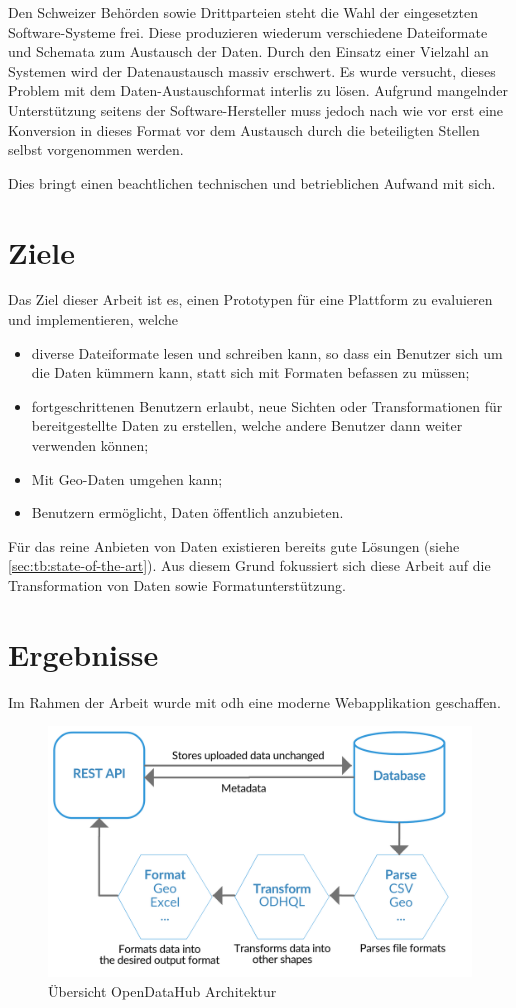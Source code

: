 Den Schweizer Behörden sowie Drittparteien steht die Wahl der eingesetzten Software-Systeme frei. Diese produzieren wiederum verschiedene Dateiformate und Schemata zum Austausch der Daten. Durch den Einsatz einer Vielzahl an Systemen wird der Datenaustausch massiv erschwert. Es wurde versucht, dieses Problem mit dem Daten-Austauschformat \gls{interlis} zu lösen. Aufgrund mangelnder Unterstützung seitens der Software-Hersteller muss jedoch nach wie vor erst eine Konversion in dieses Format vor dem Austausch durch die beteiligten Stellen selbst vorgenommen werden.

Dies bringt einen beachtlichen technischen und betrieblichen Aufwand mit sich.

\section*{Ziele}
Das Ziel dieser Arbeit ist es, einen Prototypen für eine Plattform zu evaluieren und implementieren, welche

\begin{itemize}
\item diverse Dateiformate lesen und schreiben kann, so dass ein Benutzer sich um die Daten kümmern kann, statt sich mit Formaten befassen zu müssen;
\item fortgeschrittenen Benutzern erlaubt, neue Sichten oder Transformationen für bereitgestellte Daten zu erstellen, welche andere Benutzer dann weiter verwenden können;
\item Mit Geo-Daten umgehen kann;
\item Benutzern ermöglicht, Daten öffentlich anzubieten.
\end{itemize}

Für das reine Anbieten von Daten existieren bereits gute Lösungen (siehe \vref{sec:tb:state-of-the-art}). Aus diesem Grund fokussiert sich diese Arbeit auf die Transformation von Daten sowie Formatunterstützung.

\section*{Ergebnisse}
Im Rahmen der Arbeit wurde mit \acf{odh} eine moderne Webapplikation geschaffen.


\begin{figure}[H]
    \centering
    \includegraphics[width=0.8\linewidth]{fig/odh-overview}
    \caption*{Übersicht OpenDataHub Architektur}
\end{figure}

